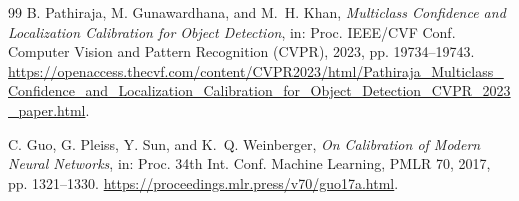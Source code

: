 \begin{thebibliography}{99}
B. Pathiraja, M. Gunawardhana, and M.~H. Khan,
\emph{Multiclass Confidence and Localization Calibration for Object
Detection},
in: Proc. IEEE/CVF Conf. Computer Vision and Pattern Recognition (CVPR),
2023, pp. 19734--19743.
\url{https://openaccess.thecvf.com/content/CVPR2023/html/Pathiraja_Multiclass_Confidence_and_Localization_Calibration_for_Object_Detection_CVPR_2023_paper.html}.

C. Guo, G. Pleiss, Y. Sun, and K.~Q. Weinberger,
\emph{On Calibration of Modern Neural Networks},
in: Proc. 34th Int. Conf. Machine Learning, PMLR 70, 2017,
pp. 1321--1330.
\url{https://proceedings.mlr.press/v70/guo17a.html}.

\end{thebibliography}
